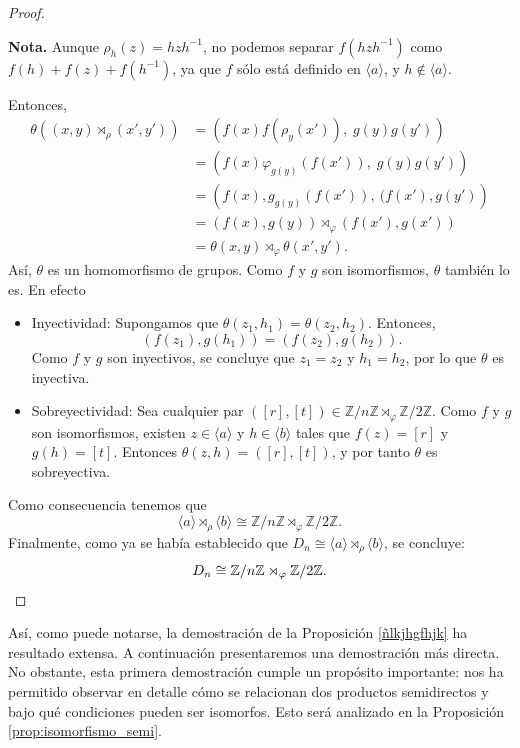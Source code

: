 \begin{proof}
\begin{itemize}
		\noindent
		\textbf{Nota.} Aunque \( \rho_h(z) = hzh^{-1} \), no podemos separar \( f(hzh^{-1}) \) como \( f(h) + f(z) + f(h^{-1}) \), ya que \( f \) sólo está definido en \( \langle a \rangle \), y \( h \notin \langle a \rangle \).
	\end{itemize}
	Entonces,
	\begin{align*}
		\theta((x,y)\rtimes_{\rho}(x',y')) 
		&= \left(f(x) f(\rho_{y}(x')),\; g(y) g(y')\right)\\
		&=\left(f(x) \varphi_{g(y)}(f(x')),\; g(y) g(y')\right) \\
		&= \left(f(x), g_{g(y)} \left(f(x')\right),\:(f(x'), g(y')\right) \\
		&=\left(f(x),g(y)\right)\rtimes_{\varphi}\left(f(x'),g(x')\right)\\
		&= \theta(x, y) \rtimes_{\varphi} \theta(x', y').
	\end{align*}
	Así, \(\theta\) es un homomorfismo de grupos. Como \(f\) y \(g\) son isomorfismos, \(\theta\) también lo es. En efecto
	\begin{itemize}
		\item Inyectividad: Supongamos que \( \theta(z_1, h_1) = \theta(z_2, h_2) \). Entonces,
		\[
		(f(z_1), g(h_1)) = (f(z_2), g(h_2)).
		\]
		Como \( f \) y \( g \) son inyectivos, se concluye que \( z_1 = z_2 \) y \( h_1 = h_2 \), por lo que \( \theta \) es inyectiva.
		
		\item Sobreyectividad: Sea cualquier par \( ([r], [t]) \in \mathbb{Z}/n\mathbb{Z} \rtimes_\varphi \mathbb{Z}/2\mathbb{Z} \). Como \( f \) y \( g \) son isomorfismos, existen \( z \in \langle a \rangle \) y \( h \in \langle b \rangle \) tales que \( f(z) = [r] \) y \( g(h) = [t] \). Entonces \( \theta(z, h) = ([r], [t]) \), y por tanto \( \theta \) es sobreyectiva.
	\end{itemize}
	Como consecuencia tenemos que 
	\[
	\langle a\rangle \rtimes_{\rho} \langle b \rangle \cong \mathbb{Z}/n\mathbb{Z} \rtimes_{\varphi} \mathbb{Z}/2\mathbb{Z}.
	\]
	Finalmente, como ya se había establecido que \(D_n \cong \langle a\rangle \rtimes_{\rho} \langle b \rangle\), se concluye:
	\[
	D_n \cong \mathbb{Z}/n\mathbb{Z} \rtimes_{\varphi} \mathbb{Z}/2\mathbb{Z}. \qedhere
	\]
\end{proof}




\medskip

Así, como puede notarse, la demostración de la Proposición \ref{ñlkjhgfhjk} ha resultado extensa. A continuación presentaremos una demostración más directa. No obstante, esta primera demostración cumple un propósito importante: nos ha permitido observar en detalle cómo se relacionan dos productos semidirectos y bajo qué condiciones pueden ser isomorfos. Esto será analizado en la Proposición \ref{prop:isomorfismo_semi}.\\




